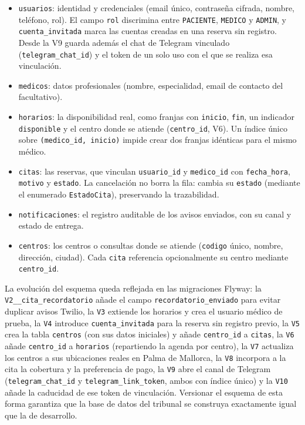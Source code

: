 \documentclass[12pt,a4paper]{report}
\begin{document}
\begin{itemize}
  \item \texttt{usuarios}: identidad y credenciales (email único, contraseña cifrada, nombre, teléfono, rol). El campo \texttt{rol} discrimina entre \texttt{PACIENTE}, \texttt{MEDICO} y \texttt{ADMIN}, y \texttt{cuenta\_invitada} marca las cuentas creadas en una reserva sin registro. Desde la V9 guarda además el chat de Telegram vinculado (\texttt{telegram\_chat\_id}) y el token de un solo uso con el que se realiza esa vinculación.
  \item \texttt{medicos}: datos profesionales (nombre, especialidad, email de contacto del facultativo).
  \item \texttt{horarios}: la disponibilidad real, como franjas con \texttt{inicio}, \texttt{fin}, un indicador \texttt{disponible} y el centro donde se atiende (\texttt{centro\_id}, V6). Un índice único sobre \texttt{(medico\_id, inicio)} impide crear dos franjas idénticas para el mismo médico.
  \item \texttt{citas}: las reservas, que vinculan \texttt{usuario\_id} y \texttt{medico\_id} con \texttt{fecha\_hora}, \texttt{motivo} y \texttt{estado}. La cancelación no borra la fila: cambia su \texttt{estado} (mediante el enumerado \texttt{EstadoCita}), preservando la trazabilidad.
  \item \texttt{notificaciones}: el registro auditable de los avisos enviados, con su canal y estado de entrega.
  \item \texttt{centros}: los centros o consultas donde se atiende (\texttt{codigo} único, nombre, dirección, ciudad). Cada \texttt{cita} referencia opcionalmente su centro mediante \texttt{centro\_id}.
\end{itemize}

La evolución del esquema queda reflejada en las migraciones Flyway: la \texttt{V2\_\_cita\_recordatorio} añade el campo \texttt{recordatorio\_enviado} para evitar duplicar avisos Twilio, la \texttt{V3} extiende los horarios y crea el usuario médico de prueba, la \texttt{V4} introduce \texttt{cuenta\_invitada} para la reserva sin registro previo, la \texttt{V5} crea la tabla \texttt{centros} (con sus datos iniciales) y añade \texttt{centro\_id} a \texttt{citas}, la \texttt{V6} añade \texttt{centro\_id} a \texttt{horarios} (repartiendo la agenda por centro), la \texttt{V7} actualiza los centros a sus ubicaciones reales en Palma de Mallorca, la \texttt{V8} incorpora a la cita la cobertura y la preferencia de pago, la \texttt{V9} abre el canal de Telegram (\texttt{telegram\_chat\_id} y \texttt{telegram\_link\_token}, ambos con índice único) y la \texttt{V10} añade la caducidad de ese token de vinculación. Versionar el esquema de esta forma garantiza que la base de datos del tribunal se construya exactamente igual que la de desarrollo.
\end{document}
